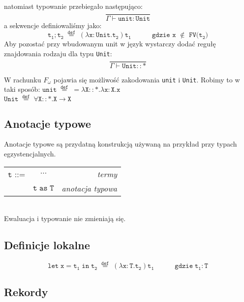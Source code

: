 \documentclass[11pt,leqno]{article}
\begin{document}
natomiast typowanie przebiegało następująco:~\[\mathtt{ \frac{}{\Gamma \vdash unit:Unit}
		}
	\]
a sekwencje definiowaliśmy jako:~\[\mathtt{ t_1;t_2 \;\overset{def}{=}\; (\lambda x:Unit.t_2)t_1 \hspace{3em} \text{gdzie x $\notin$ FV($t_2$)}
		}
	\]
Aby pozostać przy wbudowanym unit w język wystarczy dodać regułę znajdowania rodzaju dla typu \texttt{Unit}:~\[\mathtt{ \frac{}{\Gamma \vdash Unit::\ast}
		}
	\]

W rachunku $F_\omega$ pojawia się możliwość zakodowania \texttt{unit} i \texttt{Unit}. Robimy to w taki sposób:
$\mathtt{unit \;\overset{def}{=}\;= \lambda X::\ast.\lambda x:X.x}$ \\
$\mathtt{Unit \;\overset{def}{=}\; \forall X::\ast.X \rightarrow X}$ \\


\subsection{Anotacje typowe}

Anotacje typowe są przydatną konstrukcją używaną na przykład przy typach egzystencjalnych.\\
\begin{tabular}{| l c r |}
  \hline
  $\mathtt{t}$ ::= & $\cdots$ & \textit{termy}  \\
   & $\mathtt{t\;as\;T}$ &\textit{anotacja typowa} \\
  \hline
\end{tabular} \\

Ewaluacja i typowanie nie zmieniają się.

\subsection{Definicje lokalne}

 	\[\mathtt{let\;x=t_1\;in\;t_2 \;\overset{def}{=}\;(\lambda x:T.t_2)t_1 \hspace{3em}\text{gdzie}\; t_1:T 
		}
	\]

\subsection{Rekordy}
\end{document}
